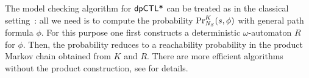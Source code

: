 The model checking algorithm for $\dpCTLstar$ can be treated as in the classical setting~\cite{BK:08:PMC}:  all we need is to  compute the  probability
  $\myPr{s}{K}{\neighbor{S}}{\phi}$ with general path formula $\phi$. For this purpose one first constructs a deterministic $\omega$-automaton $R$ for $\phi$. Then, the probability reduces to a
  reachability probability in the product Markov chain obtained from $K$ and $R$. There are more efficient algorithms without the product construction, see \cite{CY95,CSS03,BaierKKKMW16} for details.
